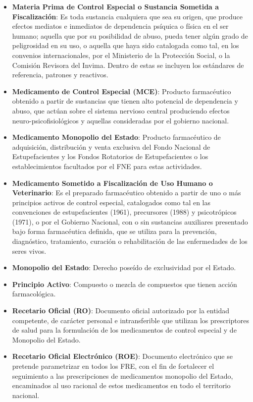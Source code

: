\documentclass[
]{book}
\begin{document}
\begin{itemize}
\item
  \textbf{Materia Prima de Control Especial o Sustancia Sometida a Fiscalización}: Es toda sustancia cualquiera que sea su origen, que produce efectos mediatos e inmediatos de dependencia psíquica o física en el ser humano; aquella que por su posibilidad de abuso, pueda tener algún grado de peligrosidad en su uso, o aquella que haya sido catalogada como tal, en los convenios internacionales, por el Ministerio de la Protección Social, o la Comisión Revisora del Invima. Dentro de estas se incluyen los estándares de referencia, patrones y reactivos.
\item
  \textbf{Medicamento de Control Especial (MCE)}: Producto farmacéutico obtenido a partir de sustancias que tienen alto potencial de dependencia y abuso, que actúan sobre el sistema nervioso central produciendo efectos neuro-psicofisiológicos y aquellas consideradas por el gobierno nacional.
\item
  \textbf{Medicamento Monopolio del Estado}: Producto farmacéutico de adquisición, distribución y venta exclusiva del Fondo Nacional de Estupefacientes y los Fondos Rotatorios de Estupefacientes o los establecimientos facultados por el FNE para estas actividades.
\item
  \textbf{Medicamento Sometido a Fiscalización de Uso Humano o Veterinario}: Es el preparado farmacéutico obtenido a partir de uno o más principios activos de control especial, catalogados como tal en las convenciones de estupefacientes (1961), precursores (1988) y psicotrópicos (1971), o por el Gobierno Nacional, con o sin sustancias auxiliares presentado bajo forma farmacéutica definida, que se utiliza para la prevención, diagnóstico, tratamiento, curación o rehabilitación de las enfermedades de los seres vivos.
\item
  \textbf{Monopolio del Estado}: Derecho poseído de exclusividad por el Estado.
\item
  \textbf{Principio Activo}: Compuesto o mezcla de compuestos que tienen acción farmacológica.
\item
  \textbf{Recetario Oficial (RO)}: Documento oficial autorizado por la entidad competente, de carácter personal e intransferible que utilizan los prescriptores de salud para la formulación de los medicamentos de control especial y de Monopolio del Estado.
\item
  \textbf{Recetario Oficial Electrónico (ROE)}: Documento electrónico que se pretende parametrizar en todos los FRE, con el fin de fortalecer el seguimiento a las prescripciones de medicamentos monopolio del Estado, encaminados al uso racional de estos medicamentos en todo el territorio nacional.

\end{itemize}
\end{document}

